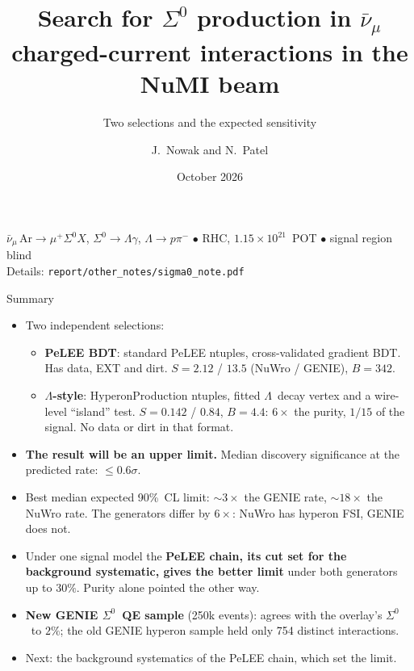 \documentclass[aspectratio=169,10pt]{beamer}
\title[$\Sigma^0$ status]{Search for $\Sigma^0$ production in $\bar\nu_\mu$ charged-current interactions in the NuMI beam}
\subtitle{Two selections and the expected sensitivity}
\author[Nowak, Patel]{J.~Nowak and N.~Patel}
\date{October 2026}
\newcommand{\Szero}{\ensuremath{\Sigma^{0}}}
\newcommand{\Lam}{\ensuremath{\Lambda}}
\begin{document}
{
\begin{frame}[plain]
  \titlepage
  \begin{center}\small\color{ubdark}
  $\bar\nu_\mu\,\mathrm{Ar}\to\mu^+\Sigma^0X$, \;$\Sigma^0\to\Lambda\gamma$, \;$\Lambda\to p\pi^-$
  \;$\bullet$\; RHC, $1.15\times10^{21}$~POT \;$\bullet$\; signal region blind\\[3pt]
  \footnotesize Details: \texttt{report/other\_notes/sigma0\_note.pdf}
  \end{center}
\end{frame}}

\begin{frame}{Summary}
  \begin{itemize}
    \item Two independent selections:
      \begin{itemize}
        \item \textbf{PeLEE BDT}: standard PeLEE ntuples, cross-validated gradient BDT.
              Has data, EXT and dirt. $S=2.12$ / $13.5$ (NuWro / GENIE), $B=342$.
        \item \textbf{\Lam-style}: HyperonProduction ntuples, fitted \Lam\ decay vertex and a
              wire-level ``island'' test. $S=0.142$ / $0.84$, $B=4.4$: $6\times$ the
              purity, $1/15$ of the signal. No data or dirt in that format.
      \end{itemize}
    \item \textbf{The result will be an upper limit.} Median discovery significance at the
          predicted rate: $\leq0.6\sigma$.
    \item Best median expected 90\%~CL limit: \alert{$\sim3\times$ the GENIE rate,
          $\sim18\times$ the NuWro rate}. The generators differ by $6\times$: NuWro has
          hyperon FSI, GENIE does not.
    \item Under one signal model the \textbf{PeLEE chain, its cut set for the background
          systematic, gives the better limit} under both generators up to $30\%$.
          Purity alone pointed the other way.
    \item \textbf{New GENIE \Szero\ QE sample} (250k events): agrees with the overlay's
          \Szero\ to $2\%$; the old GENIE hyperon sample held only 754 distinct
          interactions.
    \item Next: the \alert{background systematics of the PeLEE chain}, which set the limit.
  \end{itemize}
\end{frame}
\end{document}
